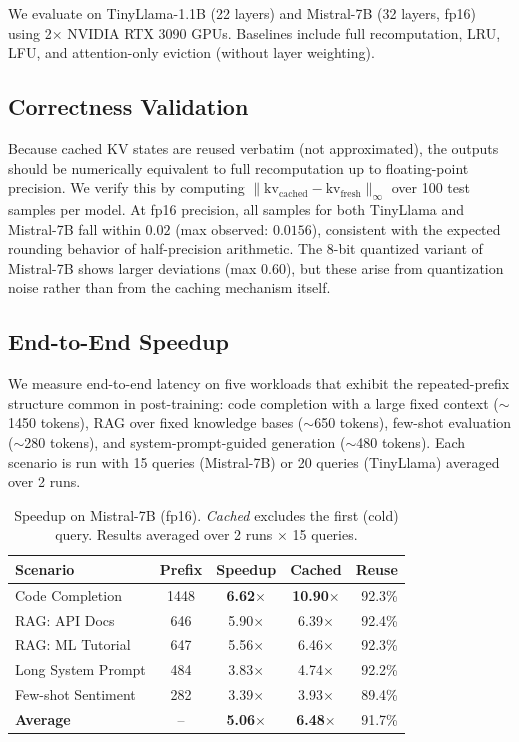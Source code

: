 \documentclass{article}
\begin{document}
We evaluate on TinyLlama-1.1B (22 layers) and Mistral-7B (32 layers, fp16) using 2$\times$ NVIDIA RTX 3090 GPUs. Baselines include full recomputation, LRU, LFU, and attention-only eviction (without layer weighting).

\subsection{Correctness Validation}

Because cached KV states are reused verbatim (not approximated), the outputs should be numerically equivalent to full recomputation up to floating-point precision. We verify this by computing $\|\text{kv}_\text{cached} - \text{kv}_\text{fresh}\|_\infty$ over 100 test samples per model. At fp16 precision, all samples for both TinyLlama and Mistral-7B fall within $0.02$ (max observed: $0.0156$), consistent with the expected rounding behavior of half-precision arithmetic. The 8-bit quantized variant of Mistral-7B shows larger deviations (max $0.60$), but these arise from quantization noise rather than from the caching mechanism itself.

\subsection{End-to-End Speedup}

We measure end-to-end latency on five workloads that exhibit the repeated-prefix structure common in post-training: code completion with a large fixed context (${\sim}$1450 tokens), RAG over fixed knowledge bases (${\sim}$650 tokens), few-shot evaluation (${\sim}$280 tokens), and system-prompt-guided generation (${\sim}$480 tokens). Each scenario is run with 15 queries (Mistral-7B) or 20 queries (TinyLlama) averaged over 2 runs.

\begin{table}[t]
\centering
\caption{Speedup on Mistral-7B (fp16). \emph{Cached} excludes the first (cold) query. Results averaged over 2 runs $\times$ 15 queries.}
\label{tab:speedup}
\small
\begin{tabular}{lcccr}
\toprule
Scenario & Prefix & Speedup & Cached & Reuse \\
\midrule
Code Completion & 1448 & \textbf{6.62$\times$} & \textbf{10.90$\times$} & 92.3\% \\
RAG: API Docs & 646 & 5.90$\times$ & 6.39$\times$ & 92.4\% \\
RAG: ML Tutorial & 647 & 5.56$\times$ & 6.46$\times$ & 92.3\% \\
Long System Prompt & 484 & 3.83$\times$ & 4.74$\times$ & 92.2\% \\
Few-shot Sentiment & 282 & 3.39$\times$ & 3.93$\times$ & 89.4\% \\
\midrule
\textbf{Average} & -- & \textbf{5.06$\times$} & \textbf{6.48$\times$} & 91.7\% \\
\bottomrule
\end{tabular}
\end{table}
\end{document}
